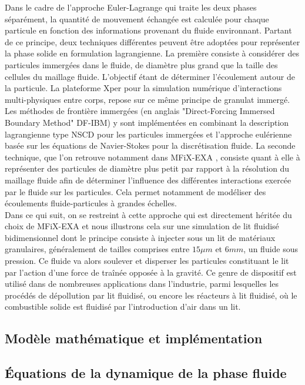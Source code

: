 Dans le cadre de l'approche Euler-Lagrange qui traite les deux phases séparément, la quantité de mouvement échangée est calculée pour chaque
particule en fonction des informations provenant du fluide environnant. Partant de ce principe, deux techniques différentes peuvent être adoptées pour représenter la phase solide en formulation lagrangienne. La première consiste à considérer des particules immergées dans le fluide, de diamètre plus grand que la taille des cellules du maillage fluide. L'objectif étant de déterminer l'écoulement autour de la particule. La plateforme Xper \cite{perales2017xper, dbouk2016df} pour la simulation numérique d'interactions multi-physiques entre corps, repose sur ce même principe de granulat immergé. Les méthodes de frontière immergées (en anglais "Direct-Forcing Immersed Boundary Method" DF-IBM) y sont implémentées en combinant la description lagrangienne type NSCD pour les particules immergées et l'approche eulérienne basée sur les équations de Navier-Stokes pour la discrétisation fluide. La seconde technique, que l'on retrouve notamment dans MFiX-EXA \cite{garg2012documentation}, consiste quant à elle à représenter des particules de diamètre plus petit par rapport à la résolution du maillage fluide afin de déterminer l'influence des différentes interactions exercée par le fluide sur les particules. Cela permet notamment de modéliser des écoulements fluide-particules à grandes échelles.\\

Dans ce qui suit, on se restreint à cette approche qui est directement héritée du choix de MFiX-EXA et nous illustrons cela sur une simulation de lit fluidisé bidimensionnel dont le principe consiste à injecter sous un lit de matériaux granulaires, généralement de tailles comprises entre $15 \mu m$ et $6 mm$, un fluide sous pression. Ce fluide va alors soulever et disperser les particules constituant le lit par l'action d'une force de traînée opposée à la gravité. Ce genre de dispositif est utilisé dans de nombreuses  applications dans l'industrie, parmi lesquelles les procédés de dépollution par lit fluidisé, ou encore les réacteurs à lit fluidisé, où le combustible solide est fluidisé par l’introduction d’air dans un lit.

\subsection{Modèle mathématique et implémentation}

\subsection*{Équations de la dynamique de la phase fluide}

